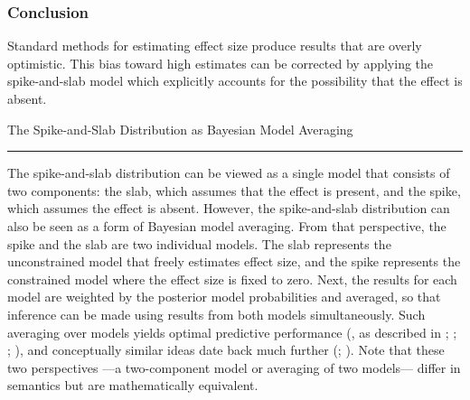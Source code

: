 \documentclass[a4paper]{article}
\begin{document}
\subsubsection*{Conclusion}
Standard methods for estimating effect size produce results that are overly optimistic. This bias toward high estimates can be corrected by applying the spike-and-slab model which explicitly accounts for the possibility that the effect is absent. 

\newpage
\begin{NewBox2}[label=box:box1]{The Spike-and-Slab Distribution as Bayesian Model Averaging}{}%
	\vspace{6pt}\hrule\vspace{6pt}
	The spike-and-slab distribution can be viewed as a single model that consists of two components: the slab, which assumes that the effect is present, and the spike, which assumes the effect is absent. However, the spike-and-slab distribution can also be seen as a form of Bayesian model averaging. From that perspective, the spike and the slab are two individual models. The slab represents the unconstrained model that freely estimates effect size, and the spike represents the constrained model where the effect size is fixed to zero. Next, the results for each model are weighted by the posterior model probabilities and averaged, so that inference can be made using results from both models simultaneously. Such averaging over models yields optimal predictive performance (, as described in ; ; ; ), and conceptually similar ideas date back much further (; ). Note that these two perspectives ---a two-component model or averaging of two models--- differ in semantics but are mathematically equivalent.
\end{NewBox2}

\newpage


% 

\end{document}
